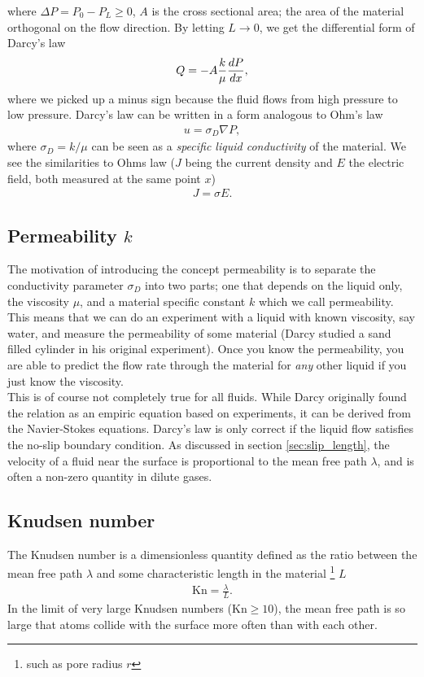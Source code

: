 where $\Delta P = P_0 - P_L \geq 0$, $A$ is the cross sectional area; the area of the material orthogonal on the flow direction. By letting $L\rightarrow 0$, we get the differential form of Darcy's law
\begin{align}
\label{eq:darcy_2}
	Q = -A{k\over \mu}{dP\over dx},
\end{align}
where we picked up a minus sign because the fluid flows from high pressure to low pressure. Darcy's law can be written in a form analogous to Ohm's law
\begin{align}
	u = \sigma_D \nabla P,
\end{align}
where $\sigma_D=k/\mu$ can be seen as a \textit{specific liquid conductivity} of the material. We see the similarities to Ohms law ($J$ being the current density and $E$ the electric field, both measured at the same point $x$) 
\begin{align}
	J = \sigma E.
\end{align}
\subsection{Permeability $k$}
The motivation of introducing the concept permeability is to separate the conductivity parameter $\sigma_D$ into two parts; one that depends on the liquid only, the viscosity $\mu$, and a material specific constant $k$ which we call permeability. This means that we can do an experiment with a liquid with known viscosity, say water, and measure the permeability of some material (Darcy studied a sand filled cylinder in his original experiment). Once you know the permeability, you are able to predict the flow rate through the material for \textit{any} other liquid if you just know the viscosity.\\
This is of course not completely true for all fluids. While Darcy originally found the relation as an empiric equation based on experiments, it can be derived from the Navier-Stokes equations. Darcy's law is only correct if the liquid flow satisfies the no-slip boundary condition. As discussed in section \ref{sec:slip_length}, the velocity of a fluid near the surface is proportional to the mean free path $\lambda$, and is often a non-zero quantity in dilute gases. 
\subsection{Knudsen number}
The Knudsen number is a dimensionless quantity defined as the ratio between the mean free path $\lambda$ and some characteristic length in the material \footnote{such as pore radius $r$} $L$
\begin{align}
	\text{Kn} = \frac{\lambda}{L}.
\end{align}
In the limit of very large Knudsen numbers (Kn$\geq 10$), the mean free path is so large that atoms collide with the surface more often than with each other. 
